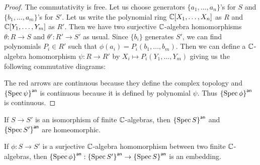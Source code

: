\begin{proof}
  The commutativity is free.
  Let us choose generators $\{a_{1},\dots,a_{n}\}$'s for $S$ and $\{b_{1},\dots,a_{m}\}$'s for $S'$.
  Let us write the polynomial ring $\mathbb{C}[X_{1},\dots,X_{n}]$ as $R$ and $\mathbb{C}[Y_{1},\dots, Y_{m}]$ as $R'$. Then we have two surjective $\mathbb{C}$-algebra homomorphisms $\theta: R \to S$ and $\theta' : R' \to S'$ as usual.
  Since $\{b_{i}\}$ generates $S'$, we can find polynomials $P_{i} \in R'$ such that $\phi(a_{i})= P_{i}(b_{1},\dots, b_{m})$. Then we can define a $\mathbb{C}$-algebra homomorphism $\psi : R \to R'$ by $X_{i} \mapsto P_{i}(Y_{1},\dots, Y_{m})$ giving us the following commutative diagrams:
  \begin{center}
  \end{center}
  The red arrows are continuous because they define the complex topology and ${\left\{{\operatorname{Spec}{\psi}}\right\}}^{\mathsf{an}}$ is continuous because it is defined by polynomial $\psi$. Thus ${\left\{{\operatorname{Spec}{\phi}}\right\}}^{\mathsf{an}}$ is continuous.
\end{proof}

\begin{corollary}
  If $S \to S'$ is an isomorphism of finite $\mathbb{C}$-algebras, then ${\left\{{\operatorname{Spec}{S}}\right\}}^{\mathsf{an}}$ and ${\left\{{\operatorname{Spec}{S'}}\right\}}^{\mathsf{an}}$ are homeomorphic.
\end{corollary}

\begin{lemma}
  If $\phi: S \to S'$ is a surjective $\mathbb{C}$-algebra homomorphism between two finite $\mathbb{C}$-algebras, then ${\left\{{\operatorname{Spec}{\phi}}\right\}}^{\mathsf{an}} : {\left\{{\operatorname{Spec}{S'}}\right\}}^{\mathsf{an}} \to {\left\{{\ensuremath{\operatorname{Spec}}{S}}\right\}}^{\mathsf{an}}$ is an embedding.
\end{lemma}

